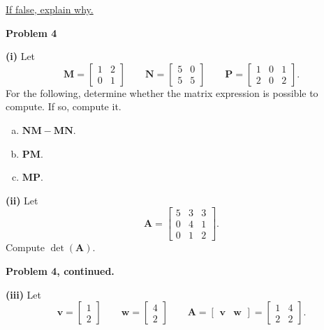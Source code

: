 \documentclass[12pt]{amsbook}
\begin{document}
\underline{If false, explain why.}








\newpage

\textbf{Problem 4}

\vspace{.25cm}

\noindent\textbf{(i)} Let
\[
\mathbf{M}= \begin{bmatrix} 1 & 2\\ 0 & 1 \end{bmatrix} \qquad \mathbf{N}=\begin{bmatrix} 5 & 0\\ 5 & 5 \end{bmatrix} \qquad \mathbf{P}=\begin{bmatrix} 1 & 0 & 1\\ 2 & 0 & 2 \end{bmatrix}.
\]
For the following, determine whether the matrix expression is possible to compute.  If so, compute it.
\begin{enumerate}[(a)]
    \item $\mathbf{NM}-\mathbf{MN}$.
    \item $\mathbf{PM}$.
    \item $\mathbf{MP}$.
\end{enumerate}

\vspace*{10cm}

\noindent\textbf{(ii)} Let 
\[
\mathbf{A}= \begin{bmatrix} 5 & 3 & 3 \\ 0 & 4 & 1\\ 0 & 1 & 2 \end{bmatrix}.
\]
Compute $\det(\mathbf{A})$.


\vspace*{4cm}

\newpage
\textbf{Problem 4, continued.}

\noindent\textbf{(iii)} Let 
\[
\mathbf{v}=\begin{bmatrix} 1\\ 2 \end{bmatrix} \qquad \mathbf{w}=\begin{bmatrix} 4 \\ 2 \end{bmatrix} \qquad \mathbf{A}= \begin{bmatrix} \mathbf{v} & \mathbf{w}\end{bmatrix}= \begin{bmatrix} 1 & 4\\ 2 & 2\end{bmatrix}.
\]
\end{document}
